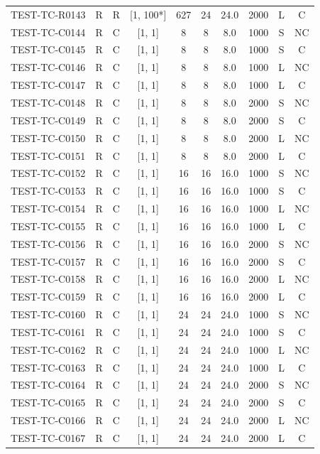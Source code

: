 \begin{longtable}{lccccccccc}
TEST-TC-R0143 & R & R & [1, 100*] & 627 & 24 & 24.0 & 2000 & L & C \\
TEST-TC-C0144 & R & C & [1, 1] & 8 & 8 & 8.0 & 1000 & S & NC \\
TEST-TC-C0145 & R & C & [1, 1] & 8 & 8 & 8.0 & 1000 & S & C \\
TEST-TC-C0146 & R & C & [1, 1] & 8 & 8 & 8.0 & 1000 & L & NC \\
TEST-TC-C0147 & R & C & [1, 1] & 8 & 8 & 8.0 & 1000 & L & C \\
TEST-TC-C0148 & R & C & [1, 1] & 8 & 8 & 8.0 & 2000 & S & NC \\
TEST-TC-C0149 & R & C & [1, 1] & 8 & 8 & 8.0 & 2000 & S & C \\
TEST-TC-C0150 & R & C & [1, 1] & 8 & 8 & 8.0 & 2000 & L & NC \\
TEST-TC-C0151 & R & C & [1, 1] & 8 & 8 & 8.0 & 2000 & L & C \\
TEST-TC-C0152 & R & C & [1, 1] & 16 & 16 & 16.0 & 1000 & S & NC \\
TEST-TC-C0153 & R & C & [1, 1] & 16 & 16 & 16.0 & 1000 & S & C \\
TEST-TC-C0154 & R & C & [1, 1] & 16 & 16 & 16.0 & 1000 & L & NC \\
TEST-TC-C0155 & R & C & [1, 1] & 16 & 16 & 16.0 & 1000 & L & C \\
TEST-TC-C0156 & R & C & [1, 1] & 16 & 16 & 16.0 & 2000 & S & NC \\
TEST-TC-C0157 & R & C & [1, 1] & 16 & 16 & 16.0 & 2000 & S & C \\
TEST-TC-C0158 & R & C & [1, 1] & 16 & 16 & 16.0 & 2000 & L & NC \\
TEST-TC-C0159 & R & C & [1, 1] & 16 & 16 & 16.0 & 2000 & L & C \\
TEST-TC-C0160 & R & C & [1, 1] & 24 & 24 & 24.0 & 1000 & S & NC \\
TEST-TC-C0161 & R & C & [1, 1] & 24 & 24 & 24.0 & 1000 & S & C \\
TEST-TC-C0162 & R & C & [1, 1] & 24 & 24 & 24.0 & 1000 & L & NC \\
TEST-TC-C0163 & R & C & [1, 1] & 24 & 24 & 24.0 & 1000 & L & C \\
TEST-TC-C0164 & R & C & [1, 1] & 24 & 24 & 24.0 & 2000 & S & NC \\
TEST-TC-C0165 & R & C & [1, 1] & 24 & 24 & 24.0 & 2000 & S & C \\
TEST-TC-C0166 & R & C & [1, 1] & 24 & 24 & 24.0 & 2000 & L & NC \\
TEST-TC-C0167 & R & C & [1, 1] & 24 & 24 & 24.0 & 2000 & L & C \\

\end{longtable}
